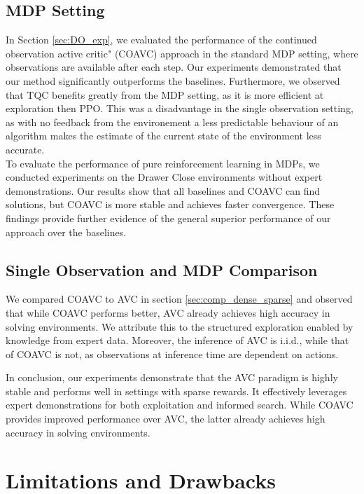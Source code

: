 \subsection{MDP Setting}
In Section \ref{sec:DO_exp}, we evaluated the performance of the continued observation active critic" (COAVC) approach in the standard MDP setting, 
where observations are available after each step. Our experiments demonstrated that our 
method significantly outperforms the baselines. Furthermore, we observed that TQC benefits greatly 
from the MDP setting, as it is more efficient at exploration then PPO. This was a disadvantage in the single observation setting, as with no feedback 
from the environement a less predictable behaviour of an algorithm makes the estimate of the current state of the environment less accurate.\\
To evaluate the performance of pure reinforcement learning in MDPs, we conducted experiments on the Drawer Close 
environments without expert demonstrations. Our results show that all baselines and COAVC can find solutions, but COAVC is more stable and achieves 
faster convergence. These findings provide further evidence of the general superior performance of our approach over the baselines. 

\subsection{Single Observation and MDP Comparison}
We compared COAVC to AVC in section \ref{sec:comp_dense_sparse} and observed that while COAVC performs better, 
AVC already achieves high accuracy in solving environments. We attribute this to the structured exploration enabled by knowledge from 
expert data. Moreover, the inference of AVC is i.i.d., while that of COAVC is not, as observations at inference time are dependent on actions. 

In conclusion, our experiments demonstrate that the AVC paradigm is highly stable and performs well in settings with sparse rewards. 
It effectively leverages expert demonstrations for both exploitation and informed search. While COAVC provides improved performance over 
AVC, the latter already achieves high accuracy in solving environments.

\section{Limitations and Drawbacks}
